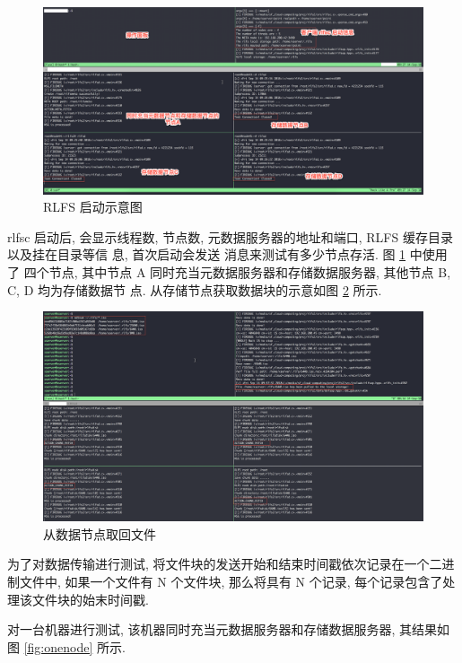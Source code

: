 \begin{figure}[H]
    \centerline{\includegraphics[width=1.0\textwidth]{./Figures/startup.png}}
    \caption{RLFS 启动示意图}
    \label{fig:rlfs-startup}
\end{figure}

rlfsc 启动后, 会显示线程数, 节点数, 元数据服务器的地址和端口, RLFS 缓存目录以及挂在目录等信
息, 首次启动会发送  消息来测试有多少节点存活. 图 \ref{fig:rlfs-startup} 中使用了
四个节点, 其中节点 A 同时充当元数据服务器和存储数据服务器, 其他节点 B, C, D 均为存储数据节
点. 从存储节点获取数据块的示意如图 \ref{fig:fetchchunk} 所示.

\begin{figure}[H]
    \centerline{\includegraphics[width=1.0\textwidth]{./Figures/fetchchunk.png}}
    \caption{从数据节点取回文件}
    \label{fig:fetchchunk}
\end{figure}

为了对数据传输进行测试, 将文件块的发送开始和结束时间戳依次记录在一个二进制文件中,
如果一个文件有 N 个文件块, 那么将具有 N 个记录, 每个记录包含了处理该文件块的始末时间戳.

对一台机器进行测试, 该机器同时充当元数据服务器和存储数据服务器,
其结果如图 \ref{fig:onenode} 所示.

